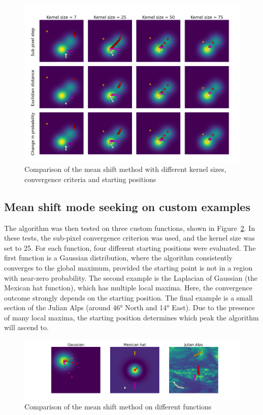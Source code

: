 \documentclass[9pt]{IEEEtran}
\begin{document}
\begin{figure}[h]
    \centering
    \includegraphics[width=0.99\columnwidth]{figures/mode_seeking.png}
    \caption{Comparison of the mean shift method with different kernel sizes, convergence
    criteria and starting positions}
    \label{fig:mode_seeking}
\end{figure}


\subsection{Mean shift mode seeking on custom examples}
The algorithm was then tested on three custom functions, shown in 
Figure~\ref{fig:mode_seeking2}. In these tests, the sub-pixel convergence criterion
 was used, and the kernel size was set to 25. For each function, four different 
 starting positions were evaluated. The first function is a Gaussian distribution, 
 where the algorithm consistently converges to the global maximum, provided the 
 starting point is not in a region with near-zero probability. The second example 
 is the Laplacian of Gaussian (the Mexican hat function), which has multiple local
  maxima. Here, the convergence outcome strongly depends on the starting position.
   The final example is a small section of the Julian Alps (around 46° North and 
   14° East). Due to the presence of many local maxima, the starting position 
   determines which peak the algorithm will ascend to. 

\begin{figure}[h]
  \centering
  \includegraphics[width=0.99\columnwidth]{figures/mode_seeking2.png}
  \caption{Comparison of the mean shift method on different functions}
  \label{fig:mode_seeking2}
\end{figure}
\end{document}
